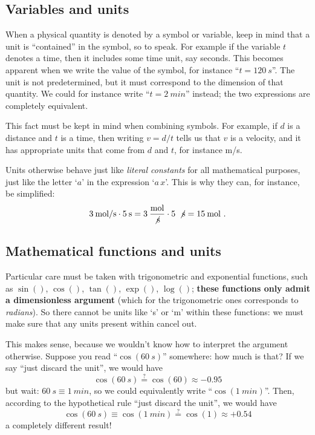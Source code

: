 \documentclass[a4paper,12pt,%
onecolumn,oneside,titlepage,%
british%
]{memoir}
\renewcommand*{\|}[1][]{\nonscript\:#1\vert\nonscript\:\mathopen{}}
\begin{document}
\subsection{Variables and units}
\label{sec:variables_units}

When a physical quantity is denoted by a symbol or variable, keep in mind that a unit is \enquote{contained} in the symbol, so to speak. For example if the variable $t$ denotes a time, then it includes some time unit, say seconds. This becomes apparent when we write the value of the symbol, for instance \enquote{$t=\qty{120}{s}$}. The unit is not predetermined, but it must correspond to the dimension of that quantity. We could for instance write \enquote{$t=\qty{2}{min}$} instead; the two expressions are completely equivalent.

This fact must be kept in mind when combining symbols. For example, if $d$ is a distance and $t$ is a time, then writing $v=d/t$ tells us that $v$ is a velocity, and it has appropriate units that come from $d$ and $t$, for instance \unit{m/s}.

Units otherwise behave just like \emph{literal constants} for all mathematical purposes, just like the letter \enquote*{$a$} in the expression \enquote*{$a\, x$}. This is why they can, for instance, be simplified:
\begin{equation*}
  \qty{3}{mol/s} \cdot \qty{5}{s} = 
  \num{3}\:\frac{\unit{mol}}{\not\unit{s}} \cdot \num{5}\:\not\unit{s} = \qty{15}{mol} \ .
\end{equation*}

\subsection{Mathematical functions and units}
\label{sec:functions_units}

Particular care must be taken with trigonometric and exponential functions, such as $\sin()$, $\cos()$, $\tan()$, $\exp()$, $\log()$; \textbf{these functions only admit a dimensionless argument} (which for the trigonometric ones corresponds to \emph{radians}). So there cannot be units like \enquote*{\unit{s}} or \enquote*{\unit{m}} within these functions: we must make sure that any units present within cancel out.

This makes sense, because we wouldn't know how to interpret the argument otherwise. Suppose you read \enquote{$\cos(\qty{60}{s})$} somewhere: how much is that? If we say \enquote{just discard the unit}, we would have
\begin{equation*}
  \cos(\qty{60}{s}) \stackrel{?}{=} \cos(60) \approx -0.95
\end{equation*}
but wait: $\qty{60}{s}\equiv\qty{1}{min}$, so we could equivalently write \enquote{$\cos(\qty{1}{min})$}. Then, according to the hypothetical rule \enquote{just discard the unit}, we would have
\begin{equation*}
  \cos(\qty{60}{s}) \equiv \cos(\qty{1}{min})\stackrel{?}{=} \cos(1) \approx +0.54
\end{equation*}
a completely different result!
\end{document}
